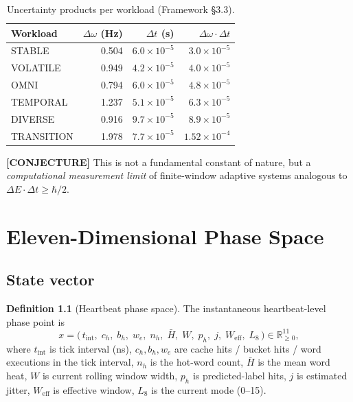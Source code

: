 \documentclass[11pt,letterpaper,openany]{book}
\theoremstyle{definition}
\newtheorem{definition}{Definition}[chapter]
\theoremstyle{plain}
\newcommand{\conjecture}{\textcolor{red!60!black}{\textbf{[CONJECTURE]}}\xspace}
\newcommand{\Weff}{W_{\mathrm{eff}}}
\newcommand{\Loop}[1]{L_{#1}}
\begin{document}
\begin{table}[H]
  \centering\small
  \begin{tabular}{l r r r}
    \toprule
    Workload    & $\Delta\omega$ (Hz) & $\Delta t$ (s) & $\Delta\omega\!\cdot\!\Delta t$ \\
    \midrule
    STABLE      & 0.504 & $6.0\times10^{-5}$ & $3.0\times10^{-5}$ \\
    VOLATILE    & 0.949 & $4.2\times10^{-5}$ & $4.0\times10^{-5}$ \\
    OMNI        & 0.794 & $6.0\times10^{-5}$ & $4.8\times10^{-5}$ \\
    TEMPORAL    & 1.237 & $5.1\times10^{-5}$ & $6.3\times10^{-5}$ \\
    DIVERSE     & 0.916 & $9.7\times10^{-5}$ & $8.9\times10^{-5}$ \\
    TRANSITION  & 1.978 & $7.7\times10^{-5}$ & $1.52\times10^{-4}$ \\
    \bottomrule
  \end{tabular}
  \caption{Uncertainty products per workload (Framework \S3.3).}
\end{table}

\conjecture This is not a fundamental constant of nature, but a
\emph{computational measurement limit} of finite-window adaptive systems
analogous to $\Delta E\cdot\Delta t \ge \hbar/2$.

\chapter{Eleven-Dimensional Phase Space}
\label{ch:phase-space}

\section{State vector}

\begin{definition}[Heartbeat phase space]
The instantaneous heartbeat-level phase point is
\[
  x = \bigl(\,t_{\mathrm{int}},\;c_h,\;b_h,\;w_e,\;n_h,\;\bar H,\;W,\;p_h,\;j,\;\Weff,\;\Loop{8}\,\bigr)\in \mathbb{R}^{11}_{\ge 0},
\]
where $t_{\mathrm{int}}$ is tick interval (ns), $c_h, b_h, w_e$ are cache
hits / bucket hits / word executions in the tick interval, $n_h$ is the
hot-word count, $\bar H$ is the mean word heat, $W$ is current rolling
window width, $p_h$ is predicted-label hits, $j$ is estimated jitter,
$\Weff$ is effective window, $\Loop{8}$ is the current mode (0--15).
\end{definition}
\end{document}
